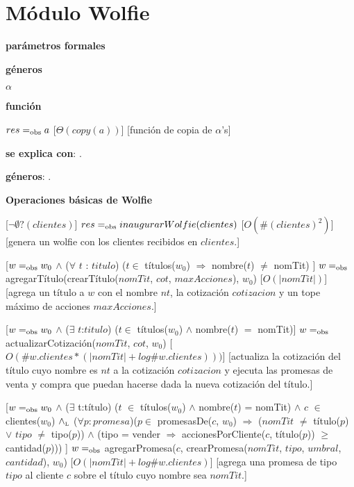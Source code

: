 \section{Módulo Wolfie}


\begin{Interfaz}
  
  \textbf{parámetros formales}\parindent\\
  \parbox{1.7cm}{\textbf{géneros}} $\alpha$\\
  \parbox[t]{1.7cm}{\textbf{función}}\parbox[t]{\textwidth-2\parindent-1.7cm}{%
    {$res =_{\mathrm{obs}} a$}
    [$\Theta(copy(a))$]
    [función de copia de $\alpha$'s]
  }

  \textbf{se explica con}: .

  \textbf{géneros}: .

  \textbf{Operaciones básicas de Wolfie}

  [$\neg \emptyset ?(clientes)$]
  {$res =_{\mathrm{obs}} inaugurarWolfie(clientes)$}%
  [$O(\#(clientes)^2)$]
  [genera un wolfie con los clientes recibidos en $clientes$.]

  [$w =_{\mathrm{obs}} w_0$ $\land$  ($\forall$ $t$ : $titulo$) ($t \in$ títulos($w_0$) $\Rightarrow$ nombre($t$) $\neq$ nomTit) ]
  {$w =_{\mathrm{obs}}$ agregarTítulo(crearTítulo($nomTit$, $cot$, $maxAcciones$), $w_0$)}
  [$O(|nomTit|)$]
  [agrega un título a $w$ con el nombre $nt$, la cotización $cotizacion$ y un tope máximo de acciones $maxAcciones$.]
  
  [$w =_{\mathrm{obs}} w_0$ $\land$ ($\exists$ $t$:$titulo$) ($t \in$ títulos($w_0$) $\land$ nombre($t$) $=$ nomTit)]
  {$w =_{\mathrm{obs}}$ actualizarCotización($nomTit$, $cot$, $w_0$)}
  [$O(\#w.clientes * (|nomTit| + log \#w.clientes)))$]
  [actualiza la cotización del título cuyo nombre es $nt$ a la cotización $cotizacion$ y ejecuta las promesas de venta y compra que puedan hacerse dada la nueva cotización del título.]
  
  [$w =_{\mathrm{obs}} w_0$ $\land$ ($\exists$ t:título) ($t$ $\in$ títulos($w_0$)
  $\land$ nombre($t$) = nomTit) $\land$ $c$ $\in$ clientes($w_0$) $\land_{\mathrm{\scriptscriptstyle{L}}}$
  ($\forall p:promesa$)($p \in$ promesasDe($c$, $w_0$) $\Rightarrow$
  ($nomTit$ $\neq$ título($p$) $\lor$ $tipo$ $\neq$ tipo($p$)) $\land$ (tipo = vender $\Rightarrow$ accionesPorCliente($c$, título($p$)) $\geq$ cantidad($p$)))
  ]
  {$w =_{\mathrm{obs}}$ agregarPromesa($c$, crearPromesa($nomTit$, $tipo$, $umbral$, $cantidad$), $w_0$)}
  [$O(|nomTit| + log \#w.clientes)$]
  [agrega una promesa de tipo $tipo$ al cliente $c$ sobre el título cuyo nombre sea $nomTit$.]    
  

\end{Interfaz}
